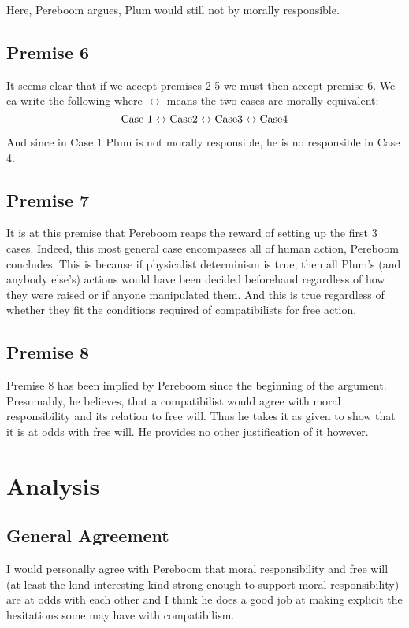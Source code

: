 \documentclass{article}
\begin{document}
\noindent Here, Pereboom argues, Plum would still not by morally responsible.

\subsection{Premise 6}
It seems clear that if we accept premises 2-5 we must then accept premise 6. We ca write the following where $\leftrightarrow$ means the two cases are morally equivalent:
$$\textnormal{Case } 1\leftrightarrow\textnormal{Case} 2\leftrightarrow\textnormal{Case} 3\leftrightarrow\textnormal{Case} 4$$

And since in Case 1 Plum is not morally responsible, he is no responsible in Case 4.

\subsection{Premise 7}
It is at this premise that Pereboom reaps the reward of setting up the first 3 cases. Indeed, this most general case encompasses all of human action, Pereboom concludes. This is because if physicalist determinism is true, then all Plum's (and anybody else's) actions would have been decided beforehand regardless of how they were raised or if anyone manipulated them. And this is true regardless of whether they fit the conditions required of compatibilists for free action.

\subsection{Premise 8}
Premise 8 has been implied by Pereboom since the beginning of the argument. Presumably, he believes, that a compatibilist would agree with moral responsibility and its relation to free will. Thus he takes it as given to show that it is at odds with free will. He provides no other justification of it however.

\section{Analysis}
\subsection{General Agreement}
I would personally agree with Pereboom that moral responsibility and free will (at least the kind interesting kind strong enough to support moral responsibility) are at odds with each other and I think he does a good job at making explicit the hesitations some may have with compatibilism.
\end{document}
